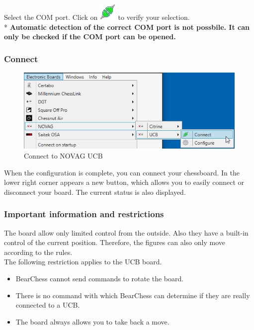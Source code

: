 \documentclass[11pt,a4paper]{article}
\begin{document}
Select the COM port. Click on \includegraphics[scale=0.5]{connect.png} to verify your selection.\\
{\color{red}*} \textbf{Automatic detection of the correct COM port is not possbile. It can only be checked if the COM port can be opened.}

\subsubsection{Connect}
\begin{figure}[H]
	\centering
	\includegraphics[scale=0.8]{NovagUCB3.png}
	\caption{Connect to NOVAG UCB}
	\label{fig:NovagUCB3}
\end{figure}
When the configuration is complete, you can connect your chessboard.
In the lower right corner appears a new button, which allows you to easily connect or disconnect your board. The current status is also displayed.

\subsubsection{Important information and restrictions} \label{InformationNovagUCB}
The board allow only limited control from the outside. Also they have a built-in control of the current position. Therefore, the figures can also only move according to the rules.\\
The following restriction applies to the UCB board.

\begin{itemize}
	\item BearChess cannot send commands to rotate the board.
	\item There is no command with which BearChess can determine if they are really connected to a UCB. 
	\item The board always allows you to take back a move.
\end{itemize}
\end{document}

